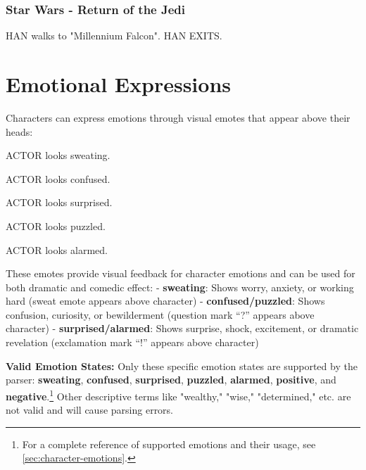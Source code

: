 \documentclass[11pt,letterpaper,oldstylefigures]{memoir}
\newcommand{\stagedir}[1]{#1\par\vspace{1\baselineskip}}
\newenvironment{FountainExample}
  {\begingroup
  \ttfamily\small
   \setlength{\parindent}{0pt}
  \setlength{\parskip}{0.5em}
  \allowdisplaybreaks
  \setlength{\displaywidowpenalty}{0}
  \setlength{\widowpenalty}{0}
  \setlength{\clubpenalty}{0}
  \setlength{\interlinepenalty}{0}
}
  {\endgroup}
\newcommand{\paragraphbreak}{\vspace{0.5em}}
\newcommand{\fountain}[1]{\textbf{#1}}
\begin{document}
\paragraphbreak

\subsubsection*{Star Wars - Return of the Jedi}
\label{ex:star-wars-return-of-the-jedi}

\begin{FountainExample}
\stagedir{HAN walks to "Millennium Falcon". HAN EXITS.}
\end{FountainExample}

\section{Emotional Expressions}
\label{sec:character-emotions}

Characters can express emotions through visual emotes that appear above their heads:

\begin{FountainExample}
\stagedir{ACTOR looks sweating.}
\end{FountainExample}

\begin{FountainExample}
\stagedir{ACTOR looks confused.}
\end{FountainExample}

\begin{FountainExample}
\stagedir{ACTOR looks surprised.}
\end{FountainExample}

\begin{FountainExample}
\stagedir{ACTOR looks puzzled.}
\end{FountainExample}

\begin{FountainExample}
\stagedir{ACTOR looks alarmed.}
\end{FountainExample}

These emotes provide visual feedback for character emotions and can be used for both dramatic and comedic effect:
- \fountain{sweating}: Shows worry, anxiety, or working hard (sweat emote appears above character)
- \fountain{confused/puzzled}: Shows confusion, curiosity, or bewilderment (question mark ``?'' appears above character)
- \fountain{surprised/alarmed}: Shows surprise, shock, excitement, or dramatic revelation (exclamation mark ``!'' appears above character)

\textbf{Valid Emotion States:} Only these specific emotion states are supported by the parser: \fountain{sweating}, \fountain{confused}, \fountain{surprised}, \fountain{puzzled}, \fountain{alarmed}, \fountain{positive}, and \fountain{negative}.\footnote{For a complete reference of supported emotions and their usage, see \autoref{sec:character-emotions}.} Other descriptive terms like "wealthy," "wise," "determined," etc. are not valid and will cause parsing errors.
\end{document}
